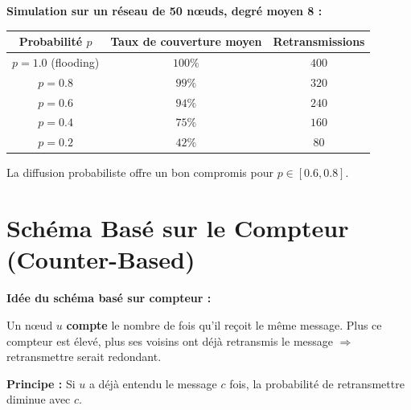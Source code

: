 \documentclass[12pt,a4paper]{article}
\begin{document}
\begin{exemple}
\textbf{Simulation sur un réseau de 50 nœuds, degré moyen 8 :}

\begin{center}
\begin{tabular}{|c|c|c|}
\hline
\textbf{Probabilité $p$} & \textbf{Taux de couverture moyen} & \textbf{Retransmissions} \\
\hline
$p = 1.0$ (flooding) & $100\%$ & $400$ \\
$p = 0.8$ & $99\%$ & $320$ \\
$p = 0.6$ & $94\%$ & $240$ \\
$p = 0.4$ & $75\%$ & $160$ \\
$p = 0.2$ & $42\%$ & $80$ \\
\hline
\end{tabular}
\end{center}

La diffusion probabiliste offre un bon compromis pour $p \in [0.6, 0.8]$.
\end{exemple}

\newpage

\section{Schéma Basé sur le Compteur (Counter-Based)}

\begin{definition}
\textbf{Idée du schéma basé sur compteur :}

Un nœud $u$ \textbf{compte} le nombre de fois qu'il reçoit le même message. Plus ce compteur
est élevé, plus ses voisins ont déjà retransmis le message $\Rightarrow$ retransmettre serait
redondant.

\textbf{Principe :} Si $u$ a déjà entendu le message $c$ fois, la probabilité de retransmettre
diminue avec $c$.
\end{definition}
\end{document}
